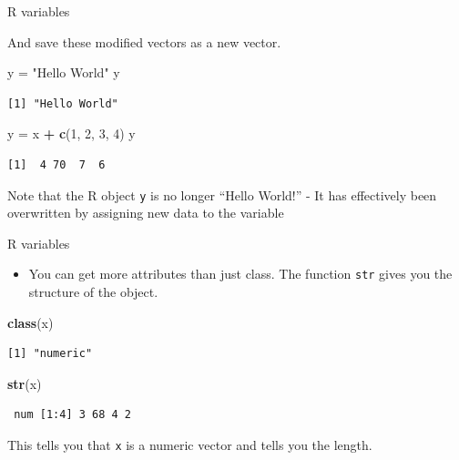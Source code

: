 \documentclass[
  ignorenonframetext,
]{beamer}
\newenvironment{Shaded}{\begin{snugshade}}{\end{snugshade}}
\newcommand{\DecValTok}[1]{\textcolor[rgb]{0.00,0.00,0.81}{#1}}
\newcommand{\KeywordTok}[1]{\textcolor[rgb]{0.13,0.29,0.53}{\textbf{#1}}}
\newcommand{\NormalTok}[1]{#1}
\newcommand{\OperatorTok}[1]{\textcolor[rgb]{0.81,0.36,0.00}{\textbf{#1}}}
\newcommand{\StringTok}[1]{\textcolor[rgb]{0.31,0.60,0.02}{#1}}
\providecommand{\tightlist}{%
  \setlength{\itemsep}{0pt}\setlength{\parskip}{0pt}}
\begin{document}
\begin{frame}[fragile]{R variables}
\protect\hypertarget{r-variables-3}{}

And save these modified vectors as a new vector.

\begin{Shaded}
\begin{Highlighting}[]
\NormalTok{y =}\StringTok{ "Hello World"}
\NormalTok{y}
\end{Highlighting}
\end{Shaded}

\begin{verbatim}
[1] "Hello World"
\end{verbatim}

\begin{Shaded}
\begin{Highlighting}[]
\NormalTok{y =}\StringTok{ }\NormalTok{x }\OperatorTok{+}\StringTok{ }\KeywordTok{c}\NormalTok{(}\DecValTok{1}\NormalTok{, }\DecValTok{2}\NormalTok{, }\DecValTok{3}\NormalTok{, }\DecValTok{4}\NormalTok{)}
\NormalTok{y }
\end{Highlighting}
\end{Shaded}

\begin{verbatim}
[1]  4 70  7  6
\end{verbatim}

Note that the R object \texttt{y} is no longer ``Hello World!'' - It has
effectively been overwritten by assigning new data to the variable

\end{frame}

\begin{frame}[fragile]{R variables}
\protect\hypertarget{r-variables-4}{}

\begin{itemize}
\tightlist
\item
  You can get more attributes than just class. The function \texttt{str}
  gives you the structure of the object.
\end{itemize}

\begin{Shaded}
\begin{Highlighting}[]
\KeywordTok{class}\NormalTok{(x)}
\end{Highlighting}
\end{Shaded}

\begin{verbatim}
[1] "numeric"
\end{verbatim}

\begin{Shaded}
\begin{Highlighting}[]
\KeywordTok{str}\NormalTok{(x)}
\end{Highlighting}
\end{Shaded}

\begin{verbatim}
 num [1:4] 3 68 4 2
\end{verbatim}

This tells you that \texttt{x} is a numeric vector and tells you the
length.

\end{frame}
\end{document}

